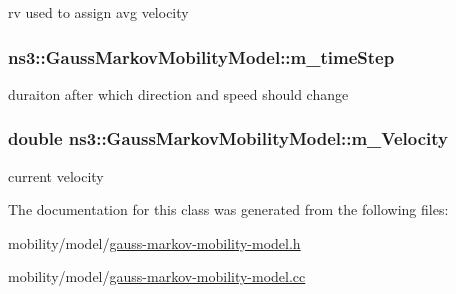 rv used to assign avg velocity 

\subsubsection[{\texorpdfstring{m\+\_\+time\+Step}{m_timeStep}}]{ ns3\+::\+Gauss\+Markov\+Mobility\+Model\+::m\+\_\+time\+Step\hspace{0.3cm}{\ttfamily [private]}}\hypertarget{classns3_1_1GaussMarkovMobilityModel_afa00618cec1c364159271f8c61d1defd}{}\label{classns3_1_1GaussMarkovMobilityModel_afa00618cec1c364159271f8c61d1defd}


duraiton after which direction and speed should change 

\subsubsection[{\texorpdfstring{m\+\_\+\+Velocity}{m_Velocity}}]{\setlength{\rightskip}{0pt plus 5cm}double ns3\+::\+Gauss\+Markov\+Mobility\+Model\+::m\+\_\+\+Velocity\hspace{0.3cm}{\ttfamily [private]}}\hypertarget{classns3_1_1GaussMarkovMobilityModel_a0529396d5840585a4b0be466025ed66c}{}\label{classns3_1_1GaussMarkovMobilityModel_a0529396d5840585a4b0be466025ed66c}


current velocity 



The documentation for this class was generated from the following files\+:\begin{DoxyCompactItemize}
\item 
mobility/model/\hyperlink{gauss-markov-mobility-model_8h}{gauss-\/markov-\/mobility-\/model.\+h}\item 
mobility/model/\hyperlink{gauss-markov-mobility-model_8cc}{gauss-\/markov-\/mobility-\/model.\+cc}\end{DoxyCompactItemize}
